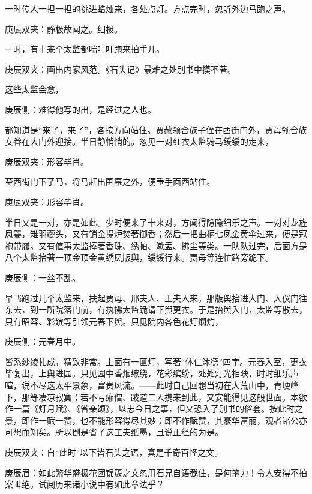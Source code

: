 \begin{parag}
    一时传人一担一担的挑进蜡烛来，各处点灯。方点完时，忽听外边马跑之声。\begin{note}庚辰双夹：静极故闻之。细极。\end{note} 一时，有十来个太监都喘吁吁跑来拍手儿。\begin{note}庚辰双夹：画出内家风范。《石头记》最难之处别书中摸不著。\end{note}这些太监会意，\begin{note}庚辰侧：难得他写的出，是经过之人也。\end{note}都知道是“来了，来了”，各按方向站住。贾赦领合族子侄在西街门外，贾母领合族女眷在大门外迎接。半日静悄悄的。忽见一对红衣太监骑马缓缓的走来，\begin{note}庚辰双夹：形容毕肖。\end{note}至西街门下了马，将马赶出围幕之外，便垂手面西站住。\begin{note}庚辰双夹：形容毕肖。\end{note}半日又是一对，亦是如此。少时便来了十来对，方闻得隐隐细乐之声。一对对龙旌凤翣，雉羽夔头，又有销金提炉焚著御香；然后一把曲柄七凤金黄伞过来，便是冠袍带履。又有值事太监捧著香珠、绣帕、漱盂、拂尘等类。一队队过完，后面方是八个太监抬著一顶金顶金黄绣凤版舆，缓缓行来。贾母等连忙路旁跪下。 \begin{note}庚辰侧：一丝不乱。\end{note}早飞跑过几个太监来，扶起贾母、邢夫人、王夫人来。那版舆抬进大门、入仪门往东去，到一所院落门前，有执拂太监跪请下舆更衣。于是抬舆入门，太监等散去，只有昭容、彩嫔等引领元春下舆。只见院内各色花灯熌灼，\begin{note}庚辰侧：元春月中。 \end{note}皆系纱绫扎成，精致非常。上面有一匾灯，写著“体仁沐德”四字。元春入室，更衣毕复出，上舆进园。只见园中香烟缭绕，花彩缤纷，处处灯光相映，时时细乐声喧，说不尽这太平景象，富贵风流。——此时自己回想当初在大荒山中，青埂峰下，那等凄凉寂寞；若不亏癞僧、跛道二人携来到此，又安能得见这般世面。本欲作一篇《灯月赋》、《省亲颂》，以志今日之事，但又恐入了别书的俗套。按此时之景，即作一赋一赞，也不能形容得尽其妙；即不作赋赞，其豪华富丽，观者诸公亦可想而知矣。所以倒是省了这工夫纸墨，且说正经的为是。\begin{note}庚辰双夹：自“此时”以下皆石头之语，真是千奇百怪之文。\end{note}\begin{note}庚辰眉：如此繁华盛极花团锦簇之文忽用石兄自语截住，是何笔力！令人安得不拍案叫绝。试阅历来诸小说中有如此章法乎？\end{note}
\end{parag}


